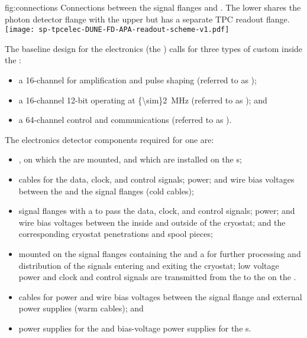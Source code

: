 \begin{dunefigure}
{fig:connections}
{Connections between the signal flanges and . The lower 
 shares the photon detector flange with the 
upper  but has a separate TPC readout flange.}
\texttt{[image: sp-tpcelec-DUNE-FD-APA-readout-scheme-v1.pdf]}
\end{dunefigure}

The baseline design for the   electronics (the ) calls for three 
types of custom  inside  the :
\begin{itemize}
\item{a \num{16}-channel   for amplification 
and pulse shaping (referred to as );}
\item{a \num{16}-channel \num{12}-bit   
operating at \SI{{\sim}2}{MHz} (referred to as ); and}
\item{a \num{64}-channel control and communications  
(referred to as ).}
\end{itemize}

The  electronics detector components required for one  are: 
\begin{itemize}
\item{, on which the  are mounted, and 
which are installed on the s;}
\item{cables for the data, clock, and control signals;  
power; and wire bias voltages between the  and the 
signal flanges (cold cables);}
\item{signal flanges with a  \fdth to pass the data, clock, 
and control signals;  power; and  wire bias 
voltages between the inside and outside of the cryostat; and 
the corresponding cryostat penetrations and spool pieces;}
\item{ mounted on the signal flanges 
containing the  and a  for further processing
and distribution of the signals entering and exiting the cryostat;
low voltage power and clock and control signals are transmitted
from the  to the  on 
the .}
\item{cables for  power and wire bias voltages between 
the signal flange and external power supplies (warm cables); and}
\item{ power supplies for the  and bias-voltage 
power supplies for the s.}
\end{itemize}

